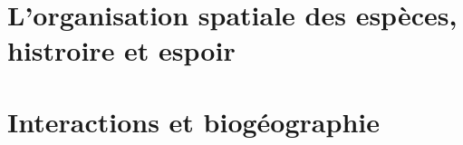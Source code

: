 \section{L'organisation spatiale des espèces, histroire et espoir}

\section{Interactions et biogéographie}

%
%
%
%
